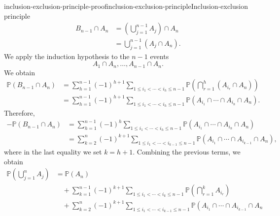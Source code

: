 \documentclass[preview]{standalone}
\begin{document}
\begin{snippetproof}{inclusion-exclusion-principle-proof}{inclusion-exclusion-principle}{Inclusion-exclusion principle}
    \begin{align*}
        B_{n-1} \cap A_n
        &=
        \left(
            \bigcup_{j=1}^{n-1} A_j
        \right)
        \cap A_n
        \\
        &=
        \bigcup_{j=1}^{n-1}
        (A_j \cap A_n).
    \end{align*}
    We apply the induction hypothesis to the \(n-1\) events
    \[
        A_1 \cap A_n,\ldots,A_{n-1} \cap A_n.
    \]
    We obtain
    \begin{align*}
        \mathbb{P}(B_{n-1} \cap A_n)
        &=
        \sum_{h=1}^{n-1}
        (-1)^{h+1}
        \sum_{1 \leq i_1 < \cdots < i_h \leq n-1}
        \mathbb{P}\left(
            \bigcap_{r=1}^{h}
            (A_{i_r} \cap A_n)
        \right)
        \\
        &=
        \sum_{h=1}^{n-1}
        (-1)^{h+1}
        \sum_{1 \leq i_1 < \cdots < i_h \leq n-1}
        \mathbb{P}\left(
            A_{i_1}
            \cap \cdots \cap
            A_{i_h}
            \cap A_n
        \right).
    \end{align*}
    Therefore,
    \begin{align*}
        -\mathbb{P}(B_{n-1} \cap A_n)
        &=
        \sum_{h=1}^{n-1}
        (-1)^h
        \sum_{1 \leq i_1 < \cdots < i_h \leq n-1}
        \mathbb{P}\left(
            A_{i_1}
            \cap \cdots \cap
            A_{i_h}
            \cap A_n
        \right)
        \\
        &=
        \sum_{k=2}^{n}
        (-1)^{k+1}
        \sum_{1 \leq i_1 < \cdots < i_{k-1} \leq n-1}
        \mathbb{P}\left(
            A_{i_1}
            \cap \cdots \cap
            A_{i_{k-1}}
            \cap A_n
        \right),
    \end{align*}
    where in the last equality we set \(k=h+1\).
    Combining the previous terms, we obtain
    \begin{align*}
        \mathbb{P}\left(
            \bigcup_{j=1}^{n} A_j
        \right)
        &=
        \mathbb{P}(A_n)
        \\
        &\quad+
        \sum_{k=1}^{n-1}
        (-1)^{k+1}
        \sum_{1 \leq i_1 < \cdots < i_k \leq n-1}
        \mathbb{P}\left(
            \bigcap_{r=1}^{k} A_{i_r}
        \right)
        \\
        &\quad+
        \sum_{k=2}^{n}
        (-1)^{k+1}
        \sum_{1 \leq i_1 < \cdots < i_{k-1} \leq n-1}
        \mathbb{P}\left(
            A_{i_1}
            \cap \cdots \cap
            A_{i_{k-1}}
            \cap A_n

\end{align*}
\end{snippetproof}
\end{document}
